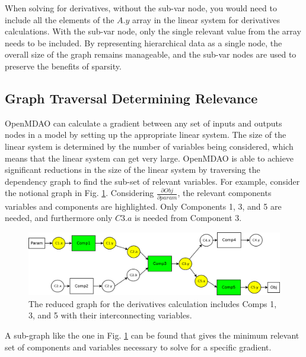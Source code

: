 \documentclass[]{aiaa-tc} %
\begin{document}
    When solving for derivatives, without the sub-var node, you would need to include all the
    elements of the $A.y$ array in the linear system for derivatives calculations.
    With the sub-var node, only the single relevant value from the array needs to be included.
    By representing hierarchical data as a single node, the overall size of the graph
    remains manageable, and the sub-var nodes are used to preserve the benefits of sparsity.


    \subsection{Graph Traversal Determining Relevance}

        OpenMDAO can calculate a gradient between any set of inputs and outputs nodes in a  
        model by setting up the appropriate linear system. The size of the linear system
        is determined by the number of variables being considered, which means that the linear
        system can get very large. OpenMDAO is able to achieve significant reductions in the
        size of the linear system by traversing the dependency graph to find the sub-set of relevant variables.
        For example, consider the notional graph in Fig. \ref{fig:graph2}. Considering $\frac{\partial Obj}{\partial param}$,
        the relevant components variables and components are highlighted. Only Components 1, 3, and 5 are needed,
        and furthermore only $C3.a$ is needed from Component 3.

        \begin{figure}[!htb]\begin{center}
          \includegraphics[width=.8\textwidth]{images/Graph2}
          \caption{ The reduced graph for the derivatives calculation includes Comps 1, 3,
          and 5 with their interconnecting variables. \label{fig:graph2}}
        \end{center}\end{figure}

        A sub-graph like the one in Fig. \ref{fig:graph2} can be found that gives
        the minimum relevant set of components and variables necessary to solve for a specific
        gradient.
\end{document}
